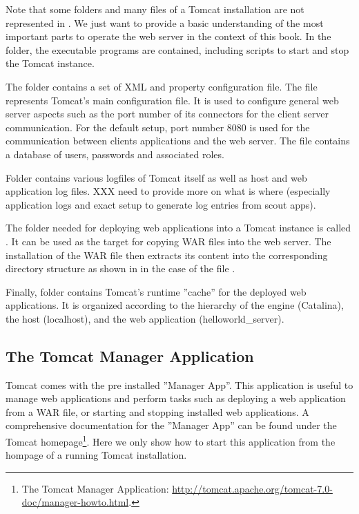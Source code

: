 \documentclass[a4paper,10pt,twoside]{book}
\begin{document}
Note that some folders and many files of a Tomcat installation are not represented in .
We just want to provide a basic understanding of the most important parts to operate the web server in the context of this book.
In the  folder, the executable programs are contained, including scripts to start and stop the Tomcat instance.

The  folder contains a set of XML and property configuration file.
The file  represents Tomcat's main configuration file.
It is used to configure general web server aspects such as the port number of its connectors for the client server communication.
For the default setup, port number 8080 is used for the communication between clients applications and the web server.
The file  contains a database of users, passwords and associated roles.

Folder  contains various logfiles of Tomcat itself as well as host and web application log files.
XXX need to provide more on what is where (especially application logs and exact setup to generate log entries from scout apps).

The folder needed for deploying web applications into a Tomcat instance is called .
It can be used as the target for copying WAR files into the web server.
The installation of the WAR file then extracts its content into the corresponding directory structure as shown in  in the case of the file .

Finally, folder  contains Tomcat's runtime ''cache'' for the deployed web applications.
It is organized according to the hierarchy of the engine (Catalina), the host (localhost), and the web application (helloworld_server).

\subsection{The Tomcat Manager Application}

Tomcat comes with the pre installed ''Manager App''.
This application is useful to manage web applications and perform tasks such as deploying a web application from a WAR file, or starting and stopping installed web applications.
A comprehensive documentation for the ''Manager App'' can be found under the Tomcat homepage\footnote{
The Tomcat Manager Application: \url{http://tomcat.apache.org/tomcat-7.0-doc/manager-howto.html}.
}.
Here we only show how to start this application from the hompage of a running Tomcat installation.
\end{document}
